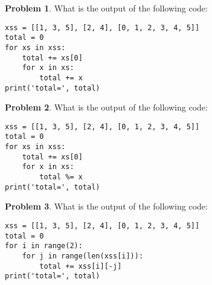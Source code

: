 \documentclass[10pt]{article}
\theoremstyle{definition}
\newtheorem{problem}{Problem}
\begin{document}
\begin{problem}
    What is the output of the following code:
\end{problem}
\begin{lstlisting}
xss = [[1, 3, 5], [2, 4], [0, 1, 2, 3, 4, 5]]
total = 0
for xs in xss:
    total += xs[0]
    for x in xs:
        total += x
print('total=', total)
\end{lstlisting}
\vspace{1.5in}

\begin{problem}
    What is the output of the following code:
\end{problem}
\begin{lstlisting}
xss = [[1, 3, 5], [2, 4], [0, 1, 2, 3, 4, 5]]
total = 0
for xs in xss:
    total += xs[0]
    for x in xs:
        total %= x
print('total=', total)
\end{lstlisting}
\vspace{1.5in}


\begin{problem}
    What is the output of the following code:
\end{problem}
\begin{lstlisting}
xss = [[1, 3, 5], [2, 4], [0, 1, 2, 3, 4, 5]]
total = 0
for i in range(2):
    for j in range(len(xss[i])):
        total += xss[i][-j]
print('total=', total)
\end{lstlisting}
\vspace{1.5in}
\end{document}
